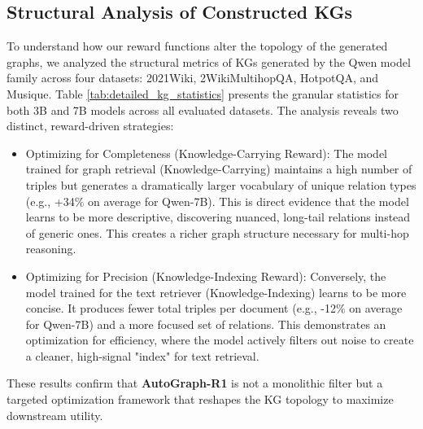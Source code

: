 \documentclass[11pt]{article}
\begin{document}
\subsection{Structural Analysis of Constructed KGs}
To understand how our reward functions alter the topology of the generated graphs, we analyzed the structural metrics of KGs generated by the Qwen model family across four datasets: 2021Wiki, 2WikiMultihopQA, HotpotQA, and Musique.
Table \ref{tab:detailed_kg_statistics} presents the granular statistics for both 3B and 7B models across all evaluated datasets.
The analysis reveals two distinct, reward-driven strategies:

\begin{itemize} \item Optimizing for Completeness (Knowledge-Carrying Reward): The model trained for graph retrieval (Knowledge-Carrying) maintains a high number of triples but generates a dramatically larger vocabulary of unique relation types (e.g., +34$\%$ on average for Qwen-7B). This is direct evidence that the model learns to be more descriptive, discovering nuanced, long-tail relations instead of generic ones. This creates a richer graph structure necessary for multi-hop reasoning. \item Optimizing for Precision (Knowledge-Indexing Reward): Conversely, the model trained for the text retriever (Knowledge-Indexing) learns to be more concise. It produces fewer total triples per document (e.g., -12$\%$ on average for Qwen-7B) and a more focused set of relations. This demonstrates an optimization for efficiency, where the model actively filters out noise to create a cleaner, high-signal "index" for text retrieval. \end{itemize}

These results confirm that \textbf{AutoGraph-R1} is not a monolithic filter but a targeted optimization framework that reshapes the KG topology to maximize downstream utility.
\end{document}
